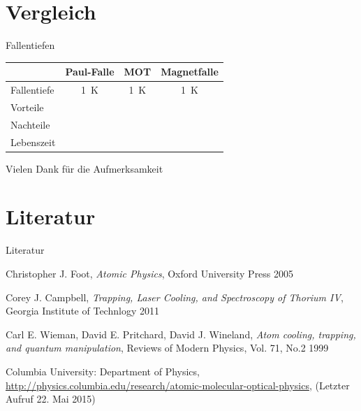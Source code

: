\documentclass[12pt]{beamer}
\begin{document}
\section{Vergleich}

\begin{frame}{Fallentiefen}
	\begin{table}
	\begin{tabular}{l | c | c | c }
		& Paul-Falle & MOT & Magnetfalle \\
		\hline
		Fallentiefe & \SI{1}{K} & \SI{1}{K} & \SI{1}{K} \\
		Vorteile & & & \\
		Nachteile & & & \\
		Lebenszeit & & & \\
	\end{tabular}
	\end{table}

\end{frame}

\begin{frame}{Vielen Dank für die Aufmerksamkeit}
\end{frame}

\section{Literatur}

\begin{frame}{Literatur}
	\begin{thebibliography}{9}
		Christopher J. Foot,
		\emph{Atomic Physics},
		Oxford University Press 2005
		
		Corey J. Campbell,
		\emph{Trapping, Laser Cooling, and Spectroscopy of Thorium IV},
		Georgia Institute of Technlogy 2011
		
		Carl E. Wieman, David E. Pritchard, David J. Wineland,
		\emph{Atom cooling, trapping, and quantum manipulation},
		Reviews of Modern Physics, Vol. 71, No.2 1999
		
		Columbia University: Department of Physics,
		\url{http://physics.columbia.edu/research/atomic-molecular-optical-physics},
		(Letzter Aufruf 22. Mai 2015)
		
		
	\end{thebibliography}
	
\end{frame}
\end{document}
